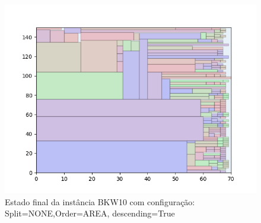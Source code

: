 \begin{figure}[H]
    \centering
    \caption[]{Estado final da instância BKW10 com configuração: Split=NONE,Order=AREA, descending=True}
    \label{fig:bkw10-none-area-true}
    \includegraphics[scale=0.5]{output/figures/bkw/bkw10/none/area/true/000}
\end{figure}